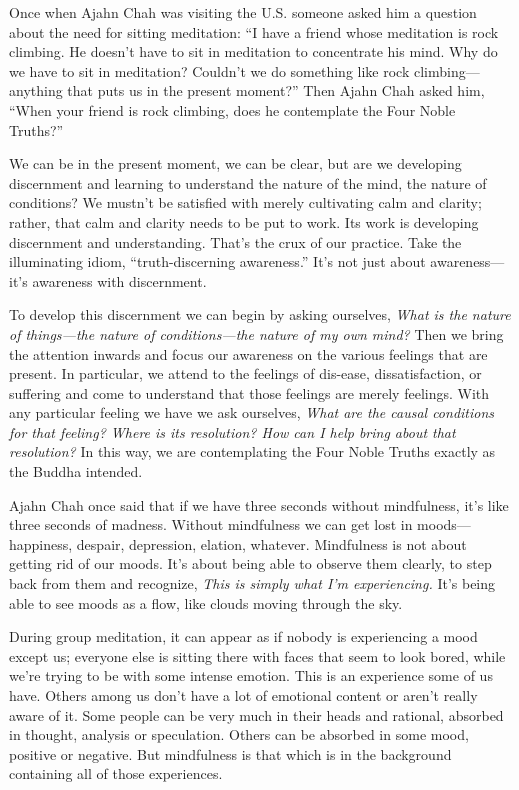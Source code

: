 Once when Ajahn Chah was visiting the U.S. someone asked him a question 
about the need for sitting meditation: ``I have a friend whose 
meditation is rock climbing. He doesn't have to sit in meditation to 
concentrate his mind. Why do we have to sit in meditation? Couldn't we 
do something like rock climbing---anything that puts us in the present 
moment?'' Then Ajahn Chah asked him, ``When your friend is rock 
climbing, does he contemplate the Four Noble Truths?''

We can be in the present moment, we can be clear, but are we developing 
discernment and learning to understand the nature of the mind, the 
nature of conditions? We mustn't be satisfied with merely cultivating 
calm and clarity; rather, that calm and clarity needs to be put to 
work. Its work is developing discernment and understanding. That's the 
crux of our practice. Take the illuminating idiom, ``truth-discerning 
awareness.'' It's not just about awareness---it's awareness with 
discernment.

To develop this discernment we can begin by asking ourselves, 
\emph{What is the nature of things---the nature of conditions---the 
nature of my own mind?} Then we bring the attention inwards and focus 
our awareness on the various feelings that are present. In particular, 
we attend to the feelings of dis-ease, dissatisfaction, or suffering 
and come to understand that those feelings are merely feelings. With 
any particular feeling we have we ask ourselves, \emph{What are the 
causal conditions for that feeling? Where is its resolution? How can I 
help bring about that resolution?} In this way, we are contemplating 
the Four Noble Truths exactly as the Buddha intended.


Ajahn Chah once said that if we have three seconds without mindfulness, 
it's like three seconds of madness. Without mindfulness we can get lost 
in moods---happiness, despair, depression, elation, whatever. 
Mindfulness is not about getting rid of our moods. It's about being 
able to observe them clearly, to step back from them and recognize, 
\emph{This is simply what I'm experiencing.} It's being able to see 
moods as a flow, like clouds moving through the sky.

During group meditation, it can appear as if nobody is experiencing a 
mood except us; everyone else is sitting there with faces that seem to 
look bored, while we're trying to be with some intense emotion. This is 
an experience some of us have. Others among us don't have a lot of 
emotional content or aren't really aware of it. Some people can be very 
much in their heads and rational, absorbed in thought, analysis or 
speculation. Others can be absorbed in some mood, positive or negative. 
But mindfulness is that which is in the background containing all of 
those experiences.

